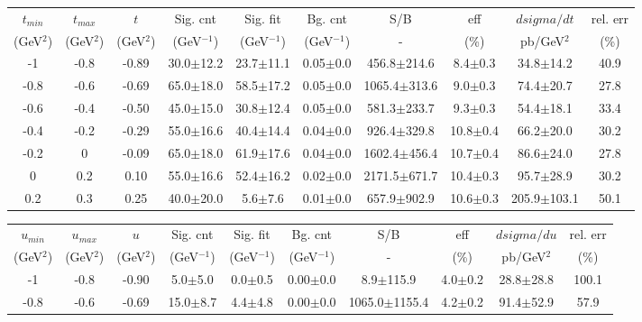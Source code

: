 \begin{landscape}
\begin{table}[hbpt]
  \begin{center}
    \begin{tabular}{|c|c|c|c|c|c|c|c|c|c|}
      \hline
      $t_{min}$ & $t_{max}$ & $t$ & Sig. cnt & Sig. fit & Bg. cnt & S/B & eff & $dsigma/dt$ & rel. err \\ 
      (GeV$^{2}$) & (GeV$^{2}$) & (GeV$^{2}$) & (GeV$^{-1}$) & (GeV$^{-1}$) & (GeV$^{-1}$) & - & (\%) & pb/GeV$^{2}$ & (\%) \\	
      \hline
 -1 & -0.8 & -0.89 & 30.0$\pm$12.2 &  23.7$\pm$11.1 &  0.05$\pm$0.0 &  456.8$\pm$214.6 & 8.4$\pm$0.3 &  34.8$\pm$14.2 & 40.9 \\ 
 \hline 
 -0.8 & -0.6 & -0.69 & 65.0$\pm$18.0 &  58.5$\pm$17.2 &  0.05$\pm$0.0 &  1065.4$\pm$313.6 & 9.0$\pm$0.3 &  74.4$\pm$20.7 & 27.8 \\ 
 \hline 
 -0.6 & -0.4 & -0.50 & 45.0$\pm$15.0 &  30.8$\pm$12.4 &  0.05$\pm$0.0 &  581.3$\pm$233.7 & 9.3$\pm$0.3 &  54.4$\pm$18.1 & 33.4 \\ 
 \hline 
 -0.4 & -0.2 & -0.29 & 55.0$\pm$16.6 &  40.4$\pm$14.4 &  0.04$\pm$0.0 &  926.4$\pm$329.8 & 10.8$\pm$0.4 &  66.2$\pm$20.0 & 30.2 \\ 
 \hline 
 -0.2 & 0 & -0.09 & 65.0$\pm$18.0 &  61.9$\pm$17.6 &  0.04$\pm$0.0 &  1602.4$\pm$456.4 & 10.7$\pm$0.4 &  86.6$\pm$24.0 & 27.8 \\ 
 \hline 
 0 & 0.2 & 0.10 & 55.0$\pm$16.6 &  52.4$\pm$16.2 &  0.02$\pm$0.0 &  2171.5$\pm$671.7 & 10.4$\pm$0.3 &  95.7$\pm$28.9 & 30.2 \\ 
 \hline 
 0.2 & 0.3 & 0.25 & 40.0$\pm$20.0 &  5.6$\pm$7.6 &  0.01$\pm$0.0 &  657.9$\pm$902.9 & 10.6$\pm$0.3 &  205.9$\pm$103.1 & 50.1 \\ 
 \hline 
    \end{tabular}
    \begin{tabular}{|c|c|c|c|c|c|c|c|c|c|}
      \hline
      $u_{min}$ & $u_{max}$ & $u$ & Sig. cnt & Sig. fit & Bg. cnt & S/B & eff & $dsigma/du$ & rel. err \\ 
      (GeV$^{2}$) & (GeV$^{2}$) & (GeV$^{2}$) & (GeV$^{-1}$) & (GeV$^{-1}$) & (GeV$^{-1}$) & - & (\%) & pb/GeV$^{2}$ & (\%) \\	
      \hline
 -1 & -0.8 & -0.90 & 5.0$\pm$5.0 &  0.0$\pm$0.5 &  0.00$\pm$0.0 &  8.9$\pm$115.9 & 4.0$\pm$0.2 &  28.8$\pm$28.8 & 100.1 \\ 
 \hline 
 -0.8 & -0.6 & -0.69 & 15.0$\pm$8.7 &  4.4$\pm$4.8 &  0.00$\pm$0.0 &  1065.0$\pm$1155.4 & 4.2$\pm$0.2 &  91.4$\pm$52.9 & 57.9 \\ 

\end{tabular}
\end{center}
\end{table}
\end{landscape}
